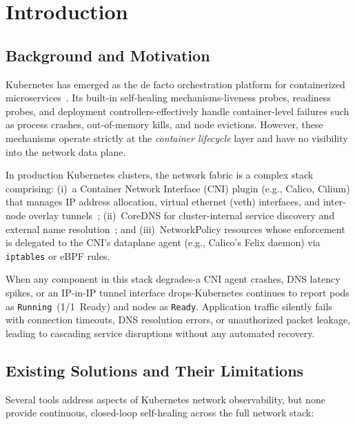 \documentclass[conference]{IEEEtran}
\begin{document}
\section{Introduction}

\subsection{Background and Motivation}
Kubernetes has emerged as the de facto orchestration platform for containerized microservices~\cite{k8s-docs}. Its built-in self-healing mechanisms-liveness probes, readiness probes, and deployment controllers-effectively handle container-level failures such as process crashes, out-of-memory kills, and node evictions. However, these mechanisms operate strictly at the \emph{container lifecycle} layer and have no visibility into the network data plane.

In production Kubernetes clusters, the network fabric is a complex stack comprising: (i)~a Container Network Interface (CNI) plugin (e.g., Calico, Cilium) that manages IP address allocation, virtual ethernet (veth) interfaces, and inter-node overlay tunnels~\cite{cni-spec, calico-docs}; (ii)~CoreDNS for cluster-internal service discovery and external name resolution~\cite{coredns-docs}; and (iii)~NetworkPolicy resources whose enforcement is delegated to the CNI's dataplane agent (e.g., Calico's Felix daemon) via \texttt{iptables} or eBPF rules.

When any component in this stack degrades-a CNI agent crashes, DNS latency spikes, or an IP-in-IP tunnel interface drops-Kubernetes continues to report pods as \texttt{Running}~(1/1~Ready) and nodes as \texttt{Ready}. Application traffic silently fails with connection timeouts, DNS resolution errors, or unauthorized packet leakage, leading to cascading service disruptions without any automated recovery.

\subsection{Existing Solutions and Their Limitations}

Several tools address aspects of Kubernetes network observability, but none provide continuous, closed-loop self-healing across the full network stack:
\end{document}

